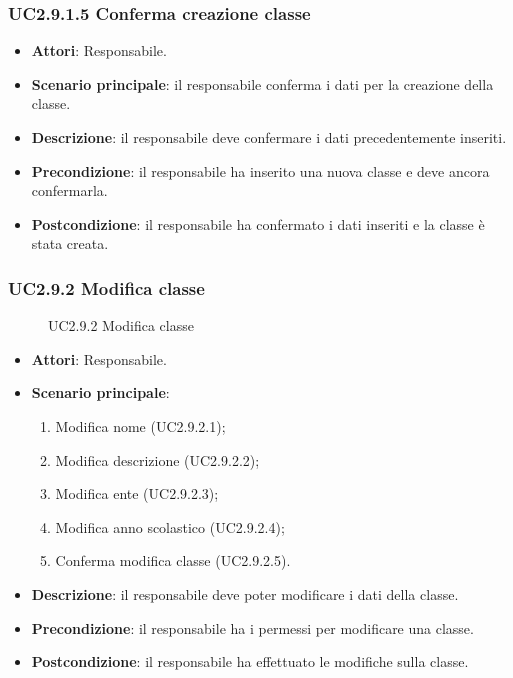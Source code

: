 \subsubsection{UC2.9.1.5 Conferma creazione classe}
\begin{itemize}
\item \textbf{Attori}: Responsabile.
\item \textbf{Scenario principale}: il responsabile conferma i dati per la creazione della classe.
\item \textbf{Descrizione}: il responsabile deve confermare i dati precedentemente inseriti.
\item \textbf{Precondizione}: il responsabile ha inserito una nuova classe e deve ancora confermarla.
\item \textbf{Postcondizione}: il responsabile ha confermato i dati inseriti e la classe è stata creata.
\end{itemize}
\subsubsection{UC2.9.2 Modifica classe}
\begin{figure}[H]
\centering
\noindent{}
\caption{UC2.9.2 Modifica classe}
\end{figure}
\begin{itemize}
\item \textbf{Attori}: Responsabile.
\item \textbf{Scenario principale}:
\begin{enumerate}
\item Modifica nome (UC2.9.2.1);
\item Modifica descrizione (UC2.9.2.2);
\item Modifica ente (UC2.9.2.3);
\item Modifica anno scolastico (UC2.9.2.4);
\item Conferma modifica classe (UC2.9.2.5).
\end{enumerate}
\item \textbf{Descrizione}: il responsabile deve poter modificare i dati della classe.
\item \textbf{Precondizione}: il responsabile ha i permessi per modificare una classe.
\item \textbf{Postcondizione}: il responsabile ha effettuato le modifiche sulla classe.
\end{itemize}

